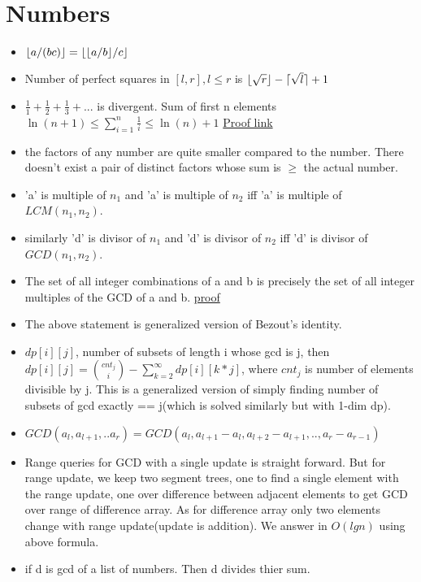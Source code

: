\documentclass[../Notes.tex]{subfiles}
\begin{document}
\chapter{Numbers}

\begin{itemize}
	\item $\floor*{a/(bc)} = \floor*{\floor*{a/b}/c}$
	\item Number of perfect squares in $[l,r], l\leq r$ is $\lfloor\sqrt{r}\rfloor-\lceil\sqrt{l}\rceil+1$  
	\item $\frac{1}{1}+\frac{1}{2}+\frac{1}{3}+...$ is divergent.
	Sum of first n elements \\
	$\ln(n+1)\le\sum_{i=1}^n\frac1i\le\ln(n)+1$
	\href{./Material/divergent series proof.pdf}{Proof link}
	\item the factors of any number are quite smaller compared to the  number. There doesn't exist a pair of distinct factors whose sum is $\geq$ the actual number.
	\item 'a' is multiple of $n_1$ and 'a' is multiple of $n_2$ iff 'a' is multiple of $LCM(n_1,n_2)$. 
	\item similarly 'd' is divisor of $n_1$ and 'd' is divisor of $n_2$ iff 'd' is divisor of $GCD(n_1,n_2)$.
	\item The set of all integer combinations of a and b is precisely the set of all integer multiples of the GCD of a and b. \href{https://proofwiki.org/wiki/Set_of_Integer_Combinations_equals_Set_of_Multiples_of_GCD}{proof}
	\item The above statement is generalized version of Bezout's identity.
	\item $dp[i][j]$, number of subsets of length i whose gcd is j, then\\
	$dp[i][j]={cnt_j\choose i}-\sum_{k=2}^{\infty}dp[i][k*j]$, where $cnt_j$ is number of elements divisible by j. This is a generalized version of simply finding number of subsets of gcd exactly == j(which is solved similarly but with 1-dim dp).
	\item $GCD(a_l,a_{l+1},..a_r) = GCD(a_l,a_{l+1}-a_l,a_{l+2}-a_{l+1},..,a_r-a_{r-1})$
	\item Range queries for GCD with a single update is straight forward. But for range update, we keep two segment trees, one to find a single element with the range update, one over difference between adjacent elements to get GCD over range of difference array. As for difference array only two elements change with range update(update is addition). We answer in $O(lgn)$ using above formula.
	\item if d is gcd of a list of numbers. Then d divides thier sum.

\end{itemize}
\end{document}
